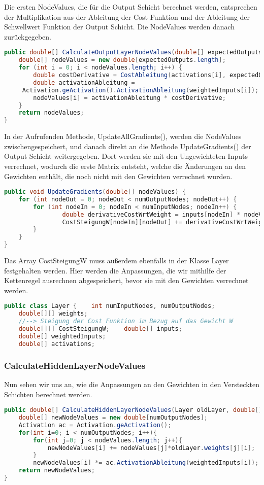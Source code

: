 \documentclass[12pt]{article}
\begin{document}
Die ersten NodeValues, die für die Output Schicht berechnet werden, entsprechen der Multiplikation aus der Ableitung der Cost Funktion und der Ableitung der Schwellwert Funktion der Output Schicht.
Die NodeValues werden danach zurückgegeben.\begin{lstlisting}[language=Java]
public double[] CalculateOutputLayerNodeValues(double[] expectedOutputs) {
    double[] nodeValues = new double[expectedOutputs.length];
    for (int i = 0; i < nodeValues.length; i++) {
        double costDerivative = CostAbleitung(activations[i], expectedOutputs[i]);
        double activationAbleitung = 
     Activation.geActivation().ActivationAbleitung(weightedInputs[i]);
        nodeValues[i] = activationAbleitung * costDerivative;
    }
    return nodeValues;
}
\end{lstlisting}In der Aufrufenden Methode, UpdateAllGradients(), werden die NodeValues zwischengespeichert, und danach direkt an die Methode UpdateGradients() der Output Schicht weitergegeben. Dort werden sie mit den Ungewichteten Inputs verrechnet, wodurch die erste Matrix entsteht, welche die Änderungen an den Gewichten enthält, die noch nicht mit den Gewichten verrechnet wurden.\begin{lstlisting}[language=Java]
public void UpdateGradients(double[] nodeValues) {
    for (int nodeOut = 0; nodeOut < numOutputNodes; nodeOut++) {
        for (int nodeIn = 0; nodeIn < numInputNodes; nodeIn++) {
	            double derivativeCostWrtWeight = inputs[nodeIn] * nodeValues[nodeOut];
	            CostSteigungW[nodeIn][nodeOut] += derivativeCostWrtWeight;
        }
    }
}
\end{lstlisting}Das Array CostSteigungW muss außerdem ebenfalls in der Klasse Layer festgehalten werden. Hier werden die Anpassungen, die wir mithilfe der Kettenregel ausrechnen abgespeichert, bevor sie mit den Gewichten verrechnet werden.\begin{lstlisting}[language=Java]
public class Layer {    int numInputNodes, numOutputNodes;
    double[][] weights;
    //--> Steigung der Cost Funktion im Bezug auf das Gewicht W
    double[][] CostSteigungW;    double[] inputs;
    double[] weightedInputs;
    double[] activations;
\end{lstlisting}\subsubsection{ CalculateHiddenLayerNodeValues}Nun sehen wir uns an, wie die Anpassungen an den Gewichten in den Versteckten Schichten berechnet werden.\begin{lstlisting}[language=Java]
public double[] CalculateHiddenLayerNodeValues(Layer oldLayer, double[] nodeValues) {
    double[] newNodeValues = new double[numOutputNodes];
    Activation ac = Activation.geActivation();
    for(int i=0; i < numOutputNodes; i++){
        for(int j=0; j < nodeValues.length; j++){
            newNodeValues[i] += nodeValues[j]*oldLayer.weights[j][i];
        } 
        newNodeValues[i] *= ac.ActivationAbleitung(weightedInputs[i]);
    return newNodeValues;
}
\end{lstlisting}
\end{document}

